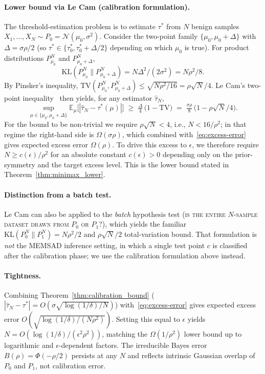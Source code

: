 \documentclass{article}
\theoremstyle{definition}
\newcommand{\EE}{\mathbb{E}}
\newcommand{\cN}{\mathcal{N}}
\newcommand{\KL}{\mathrm{KL}}
\newcommand{\TV}{\mathrm{TV}}
\begin{document}
\paragraph{Lower bound via Le Cam (calibration formulation).} The threshold-estimation problem is to estimate $\tau^*$ from $N$ benign samples $X_1, \ldots, X_N \sim P_0 = \cN(\mu_0, \sigma^2)$. Consider the two-point family $\{\mu_0, \mu_0 + \Delta\}$ with $\Delta = \sigma\rho/2$ (so $\tau^* \in \{\tau^*_0, \tau^*_0 + \Delta/2\}$ depending on which $\mu_0$ is true). For product distributions $P_{\mu_0}^N$ and $P_{\mu_0+\Delta}^N$,
\[
  \KL(P_{\mu_0}^N \| P_{\mu_0+\Delta}^N) = N\Delta^2 / (2\sigma^2) = N\rho^2/8.
\]
By Pinsker's inequality, $\TV(P_{\mu_0}^N, P_{\mu_0+\Delta}^N) \leq \sqrt{N\rho^2/16} = \rho\sqrt{N}/4$. Le Cam's two-point inequality~\citep{lecam1973convergence} then yields, for any estimator $\hat\tau_N$,
\[
  \sup_{\mu \in \{\mu_0, \mu_0+\Delta\}} \EE_\mu \big[ |\hat\tau_N - \tau^*(\mu)| \big] \;\geq\; \tfrac{\Delta}{4}\,\big(1 - \TV\big) \;=\; \tfrac{\sigma\rho}{8}\,\big(1 - \rho\sqrt{N}/4\big).
\]
For the bound to be non-trivial we require $\rho\sqrt{N} < 4$, i.e., $N < 16/\rho^2$; in that regime the right-hand side is $\Omega(\sigma\rho)$, which combined with~\eqref{eq:excess-error} gives expected excess error $\Omega(\rho)$. To drive this excess to $\epsilon$, we therefore require $N \geq c(\epsilon)/\rho^2$ for an absolute constant $c(\epsilon) > 0$ depending only on the prior-symmetry and the target excess level. This is the lower bound stated in Theorem~\ref{thm:minimax_lower}.

\paragraph{Distinction from a batch test.} Le Cam can also be applied to the \emph{batch} hypothesis test (\textsc{is the entire $N$-sample dataset drawn from $P_0$ or $P_1$?}), which yields the familiar $\KL(P_0^N \| P_1^N) = N\rho^2/2$ and $\rho\sqrt{N}/2$ total-variation bound. That formulation is \emph{not} the MEMSAD inference setting, in which a single test point $c$ is classified after the calibration phase; we use the calibration formulation above instead.

\paragraph{Tightness.} Combining Theorem~\ref{thm:calibration_bound} ($|\hat\tau_N - \tau^*| = O(\sigma\sqrt{\log(1/\delta)/N})$) with~\eqref{eq:excess-error} gives expected excess error $O(\sqrt{\log(1/\delta)/(N\rho^2)})$. Setting this equal to $\epsilon$ yields $N = O(\log(1/\delta)/(\epsilon^2\rho^2))$, matching the $\Omega(1/\rho^2)$ lower bound up to logarithmic and $\epsilon$-dependent factors. The irreducible Bayes error $B(\rho) = \Phi(-\rho/2)$ persists at any $N$ and reflects intrinsic Gaussian overlap of $P_0$ and $P_1$, not calibration error.
\end{document}
